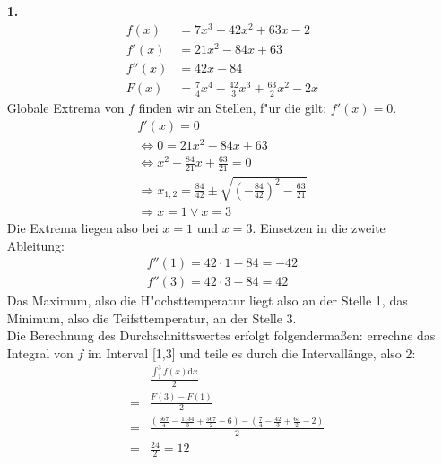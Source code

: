 \documentclass[a4paper,11pt]{article}
\title{\titleinfo}
\author{\authorinfotitle}
\date{\today}
\begin{document}
\maketitle
    \begin{enumerate}
        \item[\textbf{1.}]
            \begin{align*}
                f(x)&=7x^3-42x^2+63x-2\\
                f'(x)&=21x^2-84x+63\\
                f''(x)&=42x-84\\
                F(x)&= \frac{7}{4}x^4-\frac{42}{3}x^3+\frac{63}{2}x^2-2x
            \end{align*}
            Globale Extrema von $f$ finden wir an Stellen, f"ur die gilt: $f'(x)=0$.
            \begin{align*}
                f'(x)=0 \\
                \Leftrightarrow 0=21x^2-84x+63 \\
                \Leftrightarrow x^2-\frac{84}{21}x+\frac{63}{21}=0 \\
                \Rightarrow x_{1,2}=\frac{84}{42} \pm \sqrt{\left(- \frac{84}{42}\right)^2-\frac{63}{21}} \\
                \Rightarrow x = 1 \vee x=3
            \end{align*}
            Die Extrema liegen also bei $x=1$ und $x=3$. Einsetzen in die zweite Ableitung:
            \begin{align*}
                f''(1)=42 \cdot 1 - 84=-42 \\
                f''(3)=42 \cdot 3 - 84=42
            \end{align*}
            Das Maximum, also die H"ochsttemperatur liegt also an der Stelle 1, das Minimum, also die Teifsttemperatur, an der Stelle 3.\\
            Die Berechnung des Durchschnittswertes erfolgt folgendermaßen: errechne das Integral von $f$ im Interval [1,3] und teile es durch die
            Intervallänge, also 2:
            \begin{align*}
                &&\frac{\int_1^3 f(x) \mathrm{d}x}{2} \\
                &=& \frac{F(3)-F(1)}{2} \\
                &=& \frac{(\frac{567}{4}-\frac{1134}{3}+\frac{567}{2}-6)-(\frac{7}{4}-\frac{42}{3}+\frac{63}{2}-2)}{2} \\
                &=& \frac{24}{2}=12
            \end{align*}

\end{enumerate}
\end{document}
